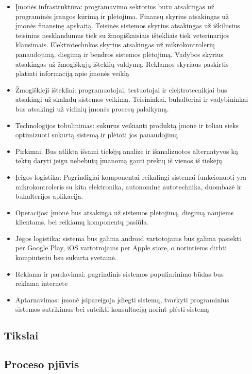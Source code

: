 \documentclass[oneside]{VUMIFPSkursinis}
\begin{document}
	\begin{itemize}
		\item{Įmonės infrastruktūra: programavimo sektorius butu atsakingas už programinės įrangos kūrimą ir plėtojima. Finansų skyrius atsakingas už įmonės finansinę apskaitą. Teisinės sistemos skyrius atsakingas už iškilusius teisinius nesklandumus tiek su žmogiškaisiais ištekliais tiek veterinarijos klausimais. Elektrotechnkos skyrius atsakingas už mikrokontrolerių panaudojimą, diegimą ir bendros sistemos plėtojimą. Vadybos skyrius atsakingas už žmogiškųjų išteklių valdymą. Reklamos skyriaus paskirtis platinti informaciją apie įmonės veiklą }
		\item{Žmogiškieji ištekliai: programuotojai, testuotojai ir elektrotecnikjai bus atsakingi už skalndų sistemos veikimą. Teisininkai, buhalteriai ir vadybininkai bus atsakingi už vidinių įmonės procesų palaikymą. }
		\item{Technologijos tobulinimas: sukūrus veikianti produktą įmonė ir toliau sieks optimizuoti sukurtą sistemą ir plėtoti jos panaudojimą }
		\item{Pirkimai: Bus atlikta išsami tiekėjų analizė ir išanalizuotos alternatyvos ką tektų daryti jeigu nebebūtų įmanomą gauti prekių iš vienos iš tiekėjų.}
		\item{Įeigos logistika: Pagrindigiai komponentai reikalingi sistemai funkcionuoti yra mikrokontroleris su kita elektronika, autonominė autotechnika, duombazė ir buhalterijos aplikacija.}
		\item{Operacijos: įmonė bus atsakinga už sistemos plėtojimą, diegimą naujiems klientams, bei reikiamų komponentų pasiūla.}
		\item{Jėgos logistika: sistema bus galima android vartotojams bus galima pasiekti per Google Play, iOS vartotrojams per Apple store, o norintiems dirbti kompiuteriu bsu sukurta svetainė.}
		\item{Reklama ir pardavimai: pagrindinis sistemos populiarinimo būdas bus reklama internete}
		\item{Aptarnavimas: įmonė įsipareigoja įdiegti sistemą, tvarkyti programinius sistemos sutrikimus bei suteikti konsultaciją norint plėsti sistemą }


	\end{itemize}

	
	\subsection{Tikslai}
	\subsection{Proceso pjūvis}
\end{document}
